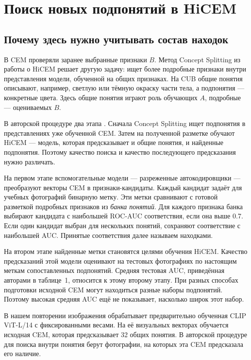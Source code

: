\documentclass[10pt]{article}
\begin{document}
\section{Поиск новых подпонятий в HiCEM}\label{sec:hicem}
\subsection{Почему здесь нужно учитывать состав находок}
В CEM проверяли заранее выбранные признаки $B$. Метод Concept Splitting из работы о HiCEM \citep{hicem} решает другую задачу: ищет более подробные признаки внутри представления модели, обученной на общих признаках. На CUB общие понятия описывают, например, светлую или тёмную окраску части тела, а подпонятия --- конкретные цвета. Здесь общие понятия играют роль обучающих $A$, подробные --- оцениваемых $B$.

В авторской процедуре два этапа \citep[§5.2]{hicem}. Сначала Concept Splitting ищет подпонятия в представлениях уже обученной CEM. Затем на полученной разметке обучают HiCEM --- модель, которая предсказывает и общие понятия, и найденные подпонятия. Поэтому качество поиска и качество последующего предсказания нужно различать.

На первом этапе вспомогательные модели --- разреженные автокодировщики --- преобразуют векторы CEM в признаки-кандидаты. Каждый кандидат задаёт для учебных фотографий бинарную метку. Эти метки сравнивают с готовой разметкой подробных признаков из \emph{банка понятий}. Для каждого признака банка выбирают кандидата с наибольшей ROC-AUC соответствия, если она выше 0.7. Если один кандидат выбран для нескольких понятий, сохраняют соответствие с наибольшей AUC. Принятые соответствия далее называем находками.

На втором этапе найденные метки становятся целями обучения HiCEM. Качество предсказаний этой модели оценивают на тестовых фотографиях по настоящим меткам сопоставленных подпонятий. Средняя тестовая AUC, приведённая авторами в таблице~1, относится к этому второму этапу. При разных способах подготовки исходной CEM могут находиться разные наборы подпонятий. Поэтому высокая средняя AUC ещё не показывает, насколько широк этот набор.

В нашем повторении изображения обрабатывает предварительно обученная CLIP ViT-L/14 с фиксированными весами. На её визуальных векторах обучается исходная CEM, которая предсказывает 32 общих понятия. В авторской процедуре для поиска внутри понятия берут фотографии, на которых эта CEM предсказала его наличие.
\end{document}
